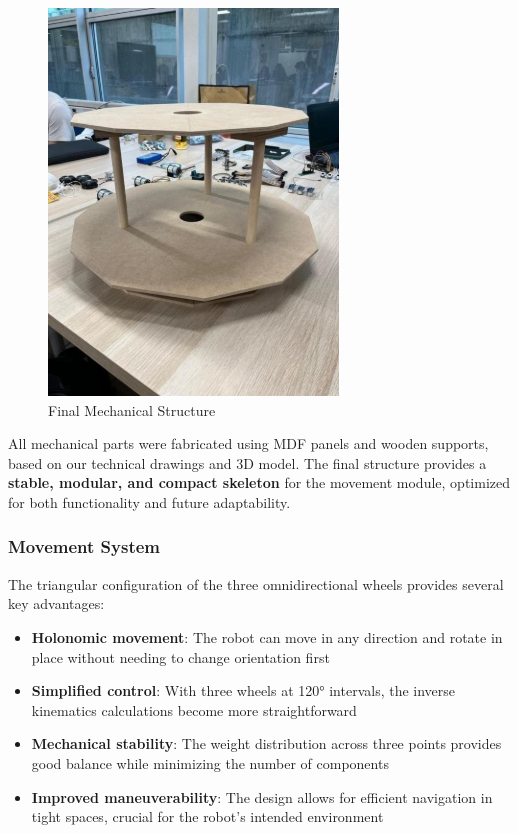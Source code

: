 \begin{figure}[H]
    \centering
    \includegraphics[width=0.7\linewidth]{../ReportMovementModule/images/Aspose.Words.728084da-df58-4b9d-a372-f65cffbdb23d.023.jpeg}
    \caption{Final Mechanical Structure}
\end{figure}

All mechanical parts were fabricated using MDF panels and wooden supports, based on our technical drawings and 3D model. The final structure provides a \textbf{stable, modular, and compact skeleton} for the movement module, optimized for both functionality and future adaptability.

\subsubsection{Movement System}

The triangular configuration of the three omnidirectional wheels provides several key advantages:

\begin{itemize}
    \item \textbf{Holonomic movement}: The robot can move in any direction and rotate in place without needing to change orientation first
    
    \item \textbf{Simplified control}: With three wheels at 120° intervals, the inverse kinematics calculations become more straightforward
    
    \item \textbf{Mechanical stability}: The weight distribution across three points provides good balance while minimizing the number of components
    
    \item \textbf{Improved maneuverability}: The design allows for efficient navigation in tight spaces, crucial for the robot's intended environment
\end{itemize}

